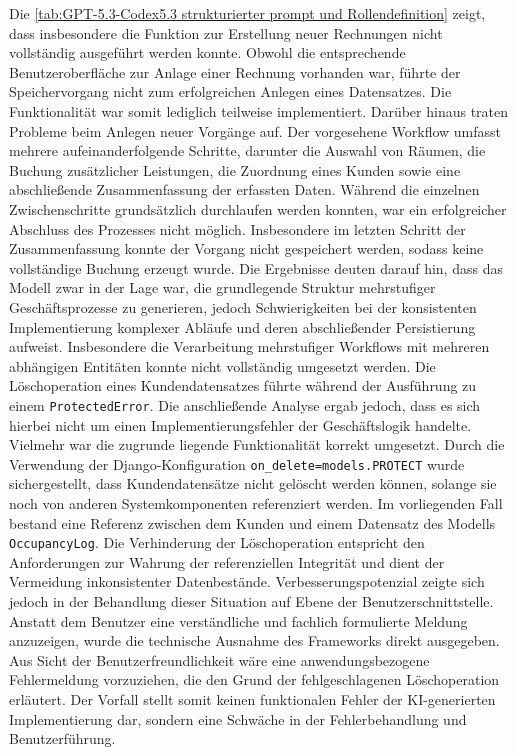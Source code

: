 Die \ref{tab:GPT-5.3-Codex5.3 strukturierter prompt und Rollendefinition} zeigt, dass insbesondere die Funktion zur Erstellung neuer Rechnungen nicht vollständig ausgeführt werden konnte.
Obwohl die entsprechende Benutzeroberfläche zur Anlage einer Rechnung vorhanden war, führte der Speichervorgang nicht zum erfolgreichen Anlegen eines Datensatzes.
Die Funktionalität war somit lediglich teilweise implementiert.
Darüber hinaus traten Probleme beim Anlegen neuer Vorgänge auf.
Der vorgesehene Workflow umfasst mehrere aufeinanderfolgende Schritte, darunter die Auswahl von Räumen, die Buchung zusätzlicher Leistungen, die Zuordnung eines Kunden sowie eine abschließende Zusammenfassung der erfassten Daten.
Während die einzelnen Zwischenschritte grundsätzlich durchlaufen werden konnten, war ein erfolgreicher Abschluss des Prozesses nicht möglich. Insbesondere im letzten Schritt der Zusammenfassung konnte der Vorgang nicht gespeichert werden, sodass keine vollständige Buchung erzeugt wurde.
Die Ergebnisse deuten darauf hin, dass das Modell zwar in der Lage war, die grundlegende Struktur mehrstufiger Geschäftsprozesse zu generieren, jedoch Schwierigkeiten bei der konsistenten Implementierung komplexer Abläufe und deren abschließender Persistierung aufweist. Insbesondere die Verarbeitung mehrstufiger Workflows mit mehreren abhängigen Entitäten konnte nicht vollständig umgesetzt werden.
Die Löschoperation eines Kundendatensatzes führte während der Ausführung zu einem \texttt{ProtectedError}. Die anschließende Analyse ergab jedoch, dass es sich hierbei nicht um einen Implementierungsfehler der Geschäftslogik handelte. Vielmehr war die zugrunde liegende Funktionalität korrekt umgesetzt. Durch die Verwendung der Django-Konfiguration \texttt{on\_delete=models.PROTECT} wurde sichergestellt, dass Kundendatensätze nicht gelöscht werden können, solange sie noch von anderen Systemkomponenten referenziert werden. Im vorliegenden Fall bestand eine Referenz zwischen dem Kunden und einem Datensatz des Modells \texttt{OccupancyLog}. Die Verhinderung der Löschoperation entspricht den Anforderungen zur Wahrung der referenziellen Integrität und dient der Vermeidung inkonsistenter Datenbestände.
Verbesserungspotenzial zeigte sich jedoch in der Behandlung dieser Situation auf Ebene der Benutzerschnittstelle. Anstatt dem Benutzer eine verständliche und fachlich formulierte Meldung anzuzeigen, wurde die technische Ausnahme des Frameworks direkt ausgegeben. Aus Sicht der Benutzerfreundlichkeit wäre eine anwendungsbezogene Fehlermeldung vorzuziehen, die den Grund der fehlgeschlagenen Löschoperation erläutert. Der Vorfall stellt somit keinen funktionalen Fehler der KI-generierten Implementierung dar, sondern eine Schwäche in der Fehlerbehandlung und Benutzerführung.

